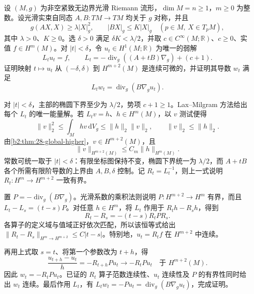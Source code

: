 \begin{optionalexercise}[解对系数参数的可微依赖]\label{b2:ex:28-coefficient-parameter}
设 \((M,g)\) 为非空紧致无边界光滑 Riemann 流形，\(\dim M=n\geq1\)，\(m\geq0\) 为整数。设光滑实束自同态 \(A,B:TM\to TM\) 均关于 \(g\) 对称，并且
\[
 g(AX,X)\geq\lambda|X|_g^2,
 \qquad |BX|_g\leq K|X|_g
 \quad(p\in M,\ X\in T_pM),
\]
其中 \(\lambda>0\)、\(K\geq0\)。选 \(\delta>0\) 满足 \(\delta K<\lambda/2\)，并取 \(c\in C^\infty(M;\mathbb R)\)、\(c\geq0\)、实值 \(f\in H^m(M)\)。对 \(|t|<\delta\)，令 \(u_t\in H^1(M;\mathbb R)\) 为唯一的弱解
\[
 L_tu_t=f,\qquad
 L_t=-\operatorname{div}_g((A+tB)\nabla_g)+(c+1).
\]
证明映射 \(t\mapsto u_t\) 从 \((-\delta,\delta)\) 到 \(H^{m+2}(M)\) 是连续可微的，并证明其导数 \(w_t\) 满足
\[
 L_tw_t=\operatorname{div}_g(B\nabla_g u_t).
\]
\end{optionalexercise}
\begin{solution}
对 \(|t|<\delta\)，主部的椭圆下界至少为 \(\lambda/2\)，势项 \(c+1\geq1\)。Lax--Milgram 方法给出每个 \(L_t\) 的唯一能量解。若 \(L_tv=h\)、\(h\in H^m(M)\)，以 \(v\) 测试便得
\[
 \|v\|_2^2\leq\int_Mhv\,\mathrm dV_g\leq\|h\|_2\|v\|_2,
 \qquad\|v\|_2\leq\|h\|_2.
\]
由\cref{b2:thm:28-global-higher}，\(v\in H^{m+2}(M)\)，且
\begin{equation}\label{b2:eq:28-ex-parameter-inverse}
 \|v\|_{H^{m+2}(M)}\leq C_m\|h\|_{H^m(M)}.
\end{equation}
常数可统一取于 \(|t|<\delta\)：有限坐标图保持不变，椭圆下界统一为 \(\lambda/2\)，而 \(A+tB\) 各个所需有限阶导数的上界由 \(A,B,\delta\) 控制。记 \(R_t=L_t^{-1}\)，则上一式说明 \(R_t:H^m\to H^{m+2}\) 一致有界。

置 \(P=-\operatorname{div}_g(B\nabla_g)\)。光滑系数的乘积法则说明 \(P:H^{m+2}\to H^m\) 有界，而且 \(L_t-L_s=(t-s)P\)。对任意 \(h\in H^m\)，将 \(L_t\) 作用于 \(R_th-R_sh\)，得到
\[
 R_t-R_s=-(t-s)R_tPR_s.
\]
各算子的定义域与值域正好依次匹配，所以该恒等式给出
\(\|R_t-R_s\|_{H^m\to H^{m+2}}\leq C|t-s|\)。特别地，\(u_t=R_tf\) 在 \(H^{m+2}\) 中连续。

再用上式取 \(s=t\)、将第一个参数改为 \(t+h\)，得
\[
 \frac{u_{t+h}-u_t}{h}=-R_{t+h}Pu_t
 \longrightarrow-R_tPu_t\quad\text{于 }H^{m+2}(M).
\]
因此 \(w_t=-R_tPu_t\)。已证的 \(R_t\) 算子范数连续性、\(u_t\) 连续性及 \(P\) 的有界性同时给出 \(w_t\) 连续。最后作用 \(L_t\)，有
\(L_tw_t=-Pu_t=\operatorname{div}_g(B\nabla_g u_t)\)，完成证明。
\end{solution}


